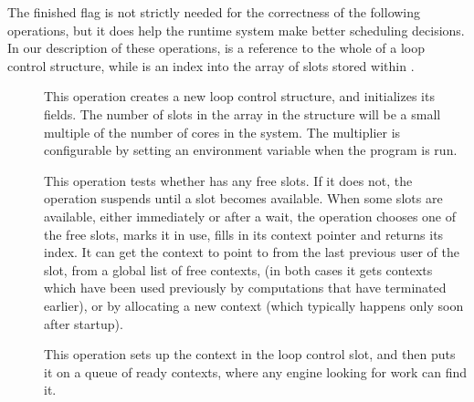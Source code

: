 \noindent
The finished flag
is not strictly needed for the correctness of the following operations,
but it does help the runtime system make better scheduling decisions.
In our description of these operations,
\LC{} is a reference to the whole of a loop control structure,
while \LCS{} is an index into the array of slots stored within \LC{}.

\begin{description}
\item[]
This operation creates a new loop control structure,
and initializes its fields.
The number of slots in the array in the structure
will be a small multiple of the number of cores in the system.
The multiplier is configurable
by setting an environment variable when the program is run.
\item[]
This operation tests whe\-ther \LC{} has any free slots.
If it does not, the operation suspends until a slot becomes available.
When some slots are available, either immediately or after a wait,
the operation chooses one of the free slots, marks it in use,
fills in its context pointer and returns its index.
It can get the context to point to
from the last previous user of the slot,
from a global list of free contexts,
(in both cases it gets contexts which have been used previously
by computations that have terminated earlier),
or by allocating a new context
(which typically happens only soon after startup).

\item[]
This operation sets up the context in the loop control slot,
and then puts it on a queue of ready contexts,
where any engine looking for work can find it.


\end{description}
